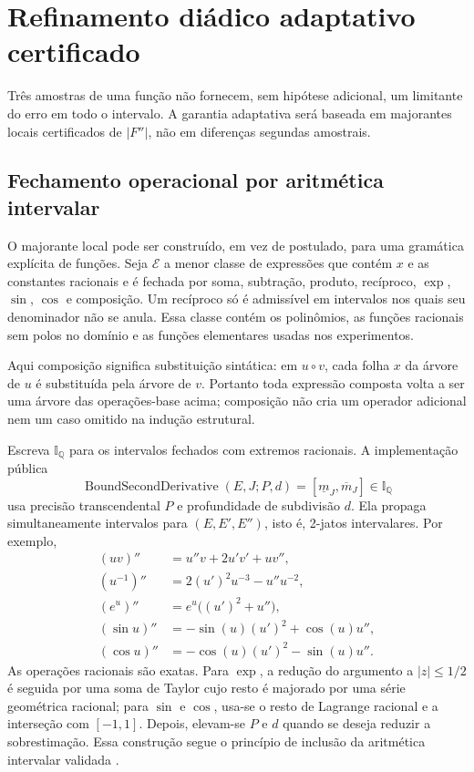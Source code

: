 \section{Refinamento diádico adaptativo certificado}
\label{sec:adaptive}

Três amostras de uma função não fornecem, sem hipótese adicional, um limitante do erro em todo o intervalo. A garantia adaptativa será baseada em majorantes locais certificados de $|F''|$, não em diferenças segundas amostrais.

\subsection{Fechamento operacional por aritmética intervalar}

O majorante local pode ser construído, em vez de postulado, para uma gramática
explícita de funções. Seja $\mathcal E$ a menor classe de expressões que contém
$x$ e as constantes racionais e é fechada por soma, subtração, produto,
recíproco, $\exp$, $\sin$, $\cos$ e composição. Um recíproco só é admissível
em intervalos nos quais seu denominador não se anula. Essa classe contém os
polinômios, as funções racionais sem polos no domínio e as funções elementares
usadas nos experimentos.

Aqui composição significa substituição sintática: em $u\circ v$, cada folha
$x$ da árvore de $u$ é substituída pela árvore de $v$. Portanto toda expressão
composta volta a ser uma árvore das operações-base acima; composição não cria
um operador adicional nem um caso omitido na indução estrutural.

Escreva $\mathbb I_{\mathbb Q}$ para os intervalos fechados com extremos
racionais. A implementação pública
\begin{equation}
 \operatorname{BoundSecondDerivative}(E,J;P,d)
   =[\underline m_J,\overline m_J]\in\mathbb I_{\mathbb Q}
 \label{eq:bound-second-interface}
\end{equation}
usa precisão transcendental $P$ e profundidade de subdivisão $d$. Ela propaga
simultaneamente intervalos para $(E,E',E'')$, isto é, 2-jatos intervalares. Por
exemplo,
\begin{align*}
 (uv)''&=u''v+2u'v'+uv'',\\
 (u^{-1})''&=2(u')^2u^{-3}-u''u^{-2},\\
 (e^u)''&=e^u\bigl((u')^2+u''\bigr),\\
 (\sin u)''&=-\sin(u)(u')^2+\cos(u)u'',\\
 (\cos u)''&=-\cos(u)(u')^2-\sin(u)u''.
\end{align*}
As operações racionais são exatas. Para $\exp$, a redução do argumento a
$|z|\le1/2$ é seguida por uma soma de Taylor cujo resto é majorado por uma
série geométrica racional; para $\sin$ e $\cos$, usa-se o resto de Lagrange
racional e a interseção com $[-1,1]$. Depois, elevam-se $P$ e $d$ quando se
deseja reduzir a sobrestimação. Essa construção segue o princípio de inclusão
da aritmética intervalar validada \citep{moore2009,silva2025}.

